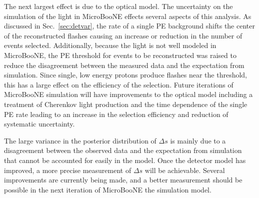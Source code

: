     The next largest effect is due to the optical model. The uncertainty on the
    simulation of the light in MicroBooNE effects several aspects of this
    analysis. As discussed in Sec.~\ref{sec:detvar}, the rate of a single PE
    background shifts the center of the reconstructed flashes causing an
    increase or reduction in the number of events selected.  Additionally,
    because the light is not well modeled in MicroBooNE, the PE threshold for
    events to be reconstructed was raised to reduce the disagreement between
    the measured data and the expectation from simulation.  Since single, low
    energy protons produce flashes near the threshold, this has a large effect
    on the efficiency of the selection. Future iterations of MicroBooNE
    simulation will have improvements to the optical model including a
    treatment of Cherenkov light production and the time dependence of the
    single PE rate leading to an increase in the selection efficiency and
    reduction of systematic uncertainty.

    The large variance in the posterior distribution of $\Delta s$ is mainly
    due to a disagreement between the observed data and the expectation from
    simulation that cannot be accounted for easily in the model. Once the
    detector model has improved, a more precise measurement of $\Delta s$ will
    be achievable. Several improvements are currently being made, and a better
    measurement should be possible in the next iteration of MicroBooNE the
    simulation model.


